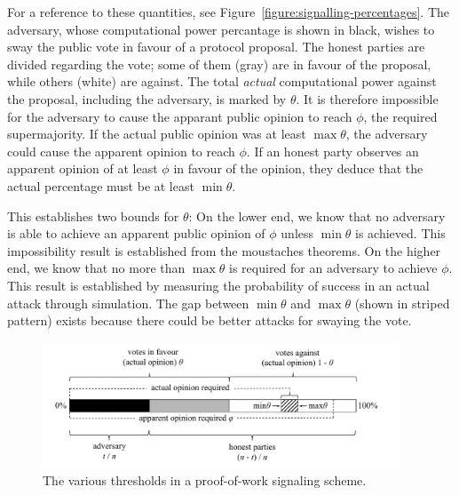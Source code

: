 For a reference to these quantities, see
Figure~\ref{figure:signalling-percentages}. The adversary, whose computational
power percantage is shown in black, wishes to sway the public vote in favour of
a protocol proposal. The honest parties are divided regarding the vote; some of
them (gray) are in favour of the proposal, while others (white) are against. The
total \emph{actual} computational power against the proposal, including the
adversary, is marked by $\theta$. It is therefore impossible for the adversary
to cause the apparant public opinion to reach $\phi$, the required
supermajority. If the actual public opinion was at least $\max\theta$, the
adversary could cause the apparent opinion to reach $\phi$. If an honest party
observes an apparent opinion of at least $\phi$ in favour of the opinion,
they deduce that the actual percentage must be at least $\min\theta$.

This establishes two bounds for $\theta$: On the lower end, we know that no
adversary is able to achieve an apparent public opinion of $\phi$ unless
$\min\theta$ is achieved. This impossibility result is established from the
moustaches theorems. On the higher end, we know that no more than $\max\theta$
is required for an adversary to achieve $\phi$. This result is established by
measuring the probability of success in an actual attack through simulation. The
gap between $\min\theta$ and $\max\theta$ (shown in striped pattern) exists
because there could be better attacks for swaying the vote.

\begin{figure}[h]
\begin{center}
    \includegraphics[width=0.95\textwidth]{figures/signalling-percentages.pdf}
  \caption{The various thresholds in a proof-of-work signaling scheme.}
  \label{fig:signalling-percentages}
  \end{center}
\end{figure}

